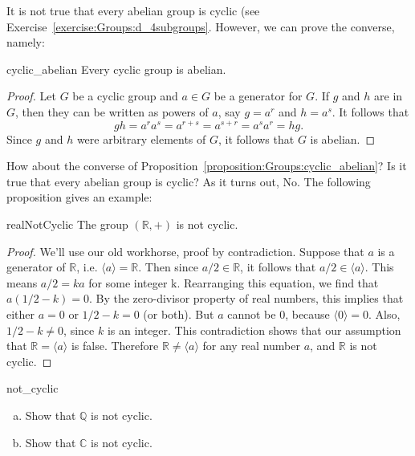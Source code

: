 It is not true that every abelian group is cyclic (see Exercise~\ref{exercise:Groups:d_4subgroups}.  However, we can prove the converse, namely:
 
\begin{prop}{cyclic_abelian}
Every cyclic group is abelian.
\end{prop}
 
 
\begin{proof}
Let $G$ be a cyclic group and $a \in G$ be a generator for $G$. If
$g$ and $h$ are in $G$, then they can be written as powers of $a$,
say $g = a^r$ and $h = a^s$. It follows that
\[
g  h = a^r a^s = a^{r+s} = a^{s+r} = a^s a^r = h g.
\]
Since $g$ and $h$ were arbitrary elements of $G$, it follows that $G$ is abelian.
\end{proof}
 
How about the converse of Proposition~\ref{proposition:Groups:cyclic_abelian}? Is it true that every abelian group is cyclic? As it turns out, No. The following proposition gives an example:

\begin{prop}{realNotCyclic}
The group $({\mathbb R},+)$ is not cyclic.
\end{prop}

\begin{proof}
We'll use our old workhorse, proof by contradiction.  Suppose that $a$ is a generator of $\mathbb{R}$, i.e. $\langle a \rangle = \mathbb{R}$.  Then since $a/2 \in  \mathbb{R}$, it follows that  $a/2 \in \langle a \rangle$. This means $a/2 =ka$ for some integer k.  Rearranging this equation, we find that $a(1/2-k)=0$.  By the zero-divisor property of real numbers, this implies that either $a=0$ or $1/2-k = 0$ (or both). But $a$ cannot be 0, because $\langle 0 \rangle = 0$.  Also, $1/2-k \neq 0$, since $k$ is an integer.  This contradiction shows that  our assumption that ${\mathbb R} = \langle a \rangle$ is false. Therefore ${\mathbb R} \neq \langle a \rangle$ for any real number $a$, and ${\mathbb R}$ is not cyclic.
\end{proof}

\begin{exercise}{not_cyclic}
\begin{enumerate}[(a)]
\item
Show that ${\mathbb Q}$ is not cyclic.   
\item
Show that ${\mathbb C}$ is not cyclic.
\end{enumerate}
\end{exercise}
 
